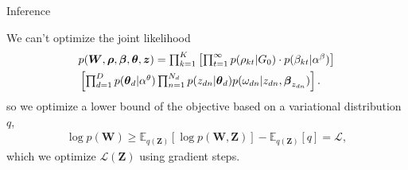 \documentclass[xcolor=dvipsnames]{beamer}
\newcommand{\e}[2]{\mathbb{E}_{#1}\left[ #2 \right] }
\newcommand{\elbo}{\mathcal{L}}
\begin{document}
\begin{frame}{Inference}

We can't optimize the joint likelihood
\begin{align}
& \textstyle p( \boldsymbol{W}, \boldsymbol{\rho}, \boldsymbol{\beta},
\boldsymbol{\theta}, \boldsymbol{z} ) = \prod_{k=1}^K
\left[ \prod_{t=1}^{\infty} p( \rho_{kt} | G_0 ) \cdot p( \beta_{kt}
| \alpha^{\beta} ) \right] \notag \\
& \textstyle \left[ \prod_{d=1}^{D} p( \boldsymbol{\theta}_d | \alpha^{\theta} )
\prod_{n=1}^{N_d} p( z_{dn} | \boldsymbol{\theta}_d ) p( \omega_{dn} |
z_{dn}, \boldsymbol{\beta}_{z_{dn}} ) \right] . \notag
\end{align}
\pause
so we optimize a lower bound of the objective based on a variational distribution $q$,
\begin{align}
\textstyle \log p(\boldsymbol{W}) \geq {\e{q(\boldsymbol{Z})}{\log p(\boldsymbol{W},\boldsymbol{Z})} - \e{q(\boldsymbol{Z})}{q}} = \elbo,
\label{eq:elbo-vague}
\end{align}
which we optimize $\elbo(\boldsymbol{Z})$ using gradient steps.
\end{frame}
\end{document}
